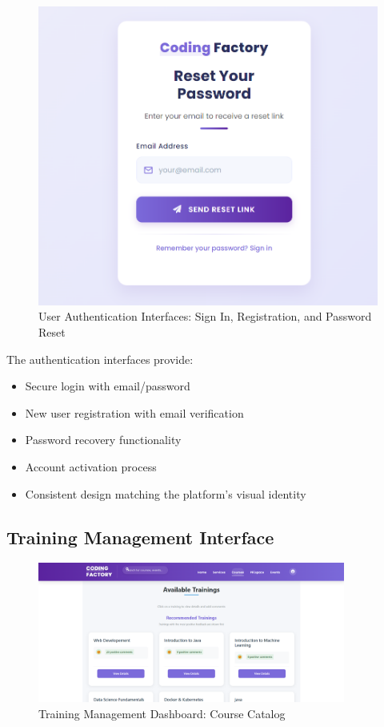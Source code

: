 \documentclass[12pt,a4paper]{report}
\begin{document}
\begin{figure}[!htbp]
\vspace{0.5cm}
\begin{minipage}{0.45\textwidth}
    \centering
    \includegraphics[width=\textwidth]{media/reset password.png}
\end{minipage}
\caption{User Authentication Interfaces: Sign In, Registration, and Password Reset}
\label{fig:auth-interfaces}
\end{figure}

The authentication interfaces provide:

\begin{itemize}
    \item Secure login with email/password
    \item New user registration with email verification
    \item Password recovery functionality
    \item Account activation process
    \item Consistent design matching the platform's visual identity
\end{itemize}

\subsection{Training Management Interface}

\begin{figure}[!htbp]
\centering
\includegraphics[width=0.9\textwidth]{media/courses.png}
\caption{Training Management Dashboard: Course Catalog}
\label{fig:training-dashboard}
\end{figure}
\end{document}
